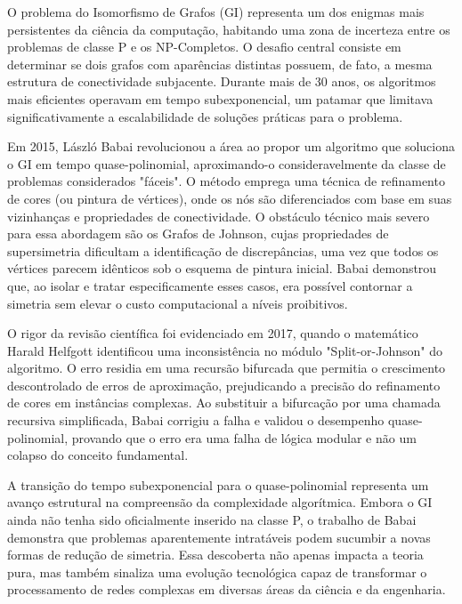 \documentclass[12pt]{article}
\begin{document}
    

    O problema do Isomorfismo de Grafos (GI) representa um dos enigmas mais persistentes da ciência da computação,
    habitando uma zona de incerteza entre os problemas de classe P e os NP-Completos.
    O desafio central consiste em determinar se dois grafos com aparências distintas possuem, de fato, a mesma estrutura de conectividade subjacente.
    Durante mais de 30 anos, os algoritmos mais eficientes operavam em tempo subexponencial,
    um patamar que limitava significativamente a escalabilidade de soluções práticas para o problema.

    Em 2015, László Babai revolucionou a área ao propor um algoritmo que soluciona o GI em tempo quase-polinomial,
    aproximando-o consideravelmente da classe de problemas considerados "fáceis".
    O método emprega uma técnica de refinamento de cores (ou pintura de vértices), onde os nós são diferenciados com base em suas vizinhanças e propriedades de conectividade.
    O obstáculo técnico mais severo para essa abordagem são os Grafos de Johnson, cujas propriedades de supersimetria dificultam a identificação de discrepâncias,
    uma vez que todos os vértices parecem idênticos sob o esquema de pintura inicial.
    Babai demonstrou que, ao isolar e tratar especificamente esses casos, era possível contornar a simetria sem elevar o custo computacional a níveis proibitivos.

    O rigor da revisão científica foi evidenciado em 2017, quando o matemático Harald Helfgott identificou uma inconsistência no módulo "Split-or-Johnson" do algoritmo.
    O erro residia em uma recursão bifurcada que permitia o crescimento descontrolado de erros de aproximação, prejudicando a precisão do refinamento de cores em instâncias complexas.
    Ao substituir a bifurcação por uma chamada recursiva simplificada, Babai corrigiu a falha e validou o desempenho quase-polinomial,
    provando que o erro era uma falha de lógica modular e não um colapso do conceito fundamental.

    A transição do tempo subexponencial para o quase-polinomial representa um avanço estrutural na compreensão da complexidade algorítmica.
    Embora o GI ainda não tenha sido oficialmente inserido na classe P, o trabalho de Babai demonstra que problemas aparentemente intratáveis podem sucumbir a novas formas de redução de simetria.
    Essa descoberta não apenas impacta a teoria pura, mas também sinaliza uma evolução tecnológica capaz de transformar o processamento de redes complexas em diversas áreas da ciência e da engenharia.
\end{document}
